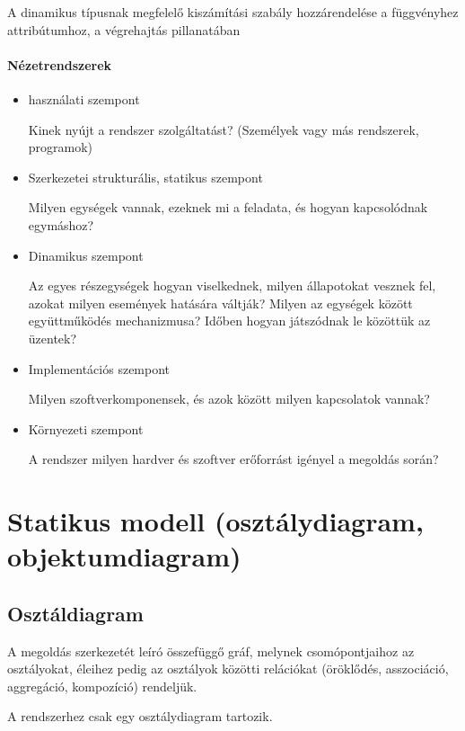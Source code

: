 \documentclass[margin=0px]{article}
\begin{document}
\begin{itemize}
\begin{itemize}
					 	A dinamikus típusnak megfelelő kiszámítási szabály hozzárendelése a függvényhez attribútumhoz, a végrehajtás pillanatában
				 \end{itemize}
				\paragraph{Nézetrendszerek}
				\begin{itemize}
					\item használati szempont
					
						Kinek nyújt a rendszer szolgáltatást? (Személyek vagy más rendszerek, programok)
						
					\item Szerkezetei strukturális, statikus szempont
					
						Milyen egységek vannak, ezeknek mi a feladata, és hogyan kapcsolódnak egymáshoz?
						
					\item Dinamikus szempont
					
						Az egyes részegységek hogyan viselkednek, milyen állapotokat vesznek fel, azokat milyen események hatására váltják? Milyen az egységek között együttműködés mechanizmusa? Időben hogyan játszódnak le közöttük az üzentek?
						
					\item Implementációs szempont
					
						Milyen szoftverkomponensek, és azok között milyen kapcsolatok vannak?
						
					\item Környezeti szempont
					
						A rendszer milyen hardver és szoftver erőforrást igényel a megoldás során?
				\end{itemize}
		\end{itemize}
	\section{Statikus modell (osztálydiagram, objektumdiagram)}
		\subsection{Osztáldiagram}
			A megoldás szerkezetét leíró összefüggő gráf, melynek csomópontjaihoz az osztályokat, éleihez pedig az osztályok közötti relációkat (öröklődés, asszociáció, aggregáció, kompozíció) rendeljük.
			
			\noindent
			A rendszerhez csak egy osztálydiagram tartozik.
			
\end{document}
